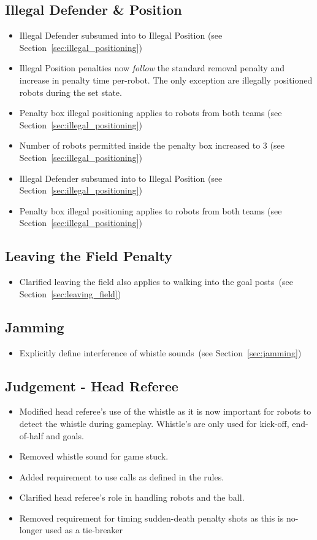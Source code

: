 \documentclass[12pt]{article}
\newcommand{\cf}{see\xspace}
\begin{document}
\subsection*{Illegal Defender \& Position}
\begin{itemize}
  \item Illegal Defender subsumed into to Illegal Position (\cf Section~\ref{sec:illegal_positioning})
  \item Illegal Position penalties now \textit{follow} the standard removal penalty and increase in penalty time per-robot. The only exception are illegally positioned robots during the set state.
  \item Penalty box illegal positioning applies to robots from both teams (\cf Section~\ref{sec:illegal_positioning})
  \item Number of robots permitted inside the penalty box increased to 3 (\cf Section~\ref{sec:illegal_positioning})
  \item Illegal Defender subsumed into to Illegal Position (\cf Section~\ref{sec:illegal_positioning})
  \item Penalty box illegal positioning applies to robots from both teams (\cf Section~\ref{sec:illegal_positioning})
\end{itemize}

\subsection*{Leaving the Field Penalty}
\begin{itemize}
  \item Clarified leaving the field also applies to walking into the goal posts~(\cf Section~\ref{sec:leaving_field})
\end{itemize}

\subsection*{Jamming}
\begin{itemize}
  \item Explicitly define interference of whistle sounds~(\cf Section~\ref{sec:jamming})
\end{itemize}

\subsection*{Judgement - Head Referee}
\begin{itemize}
  \item Modified head referee's use of the whistle as it is now important for robots to detect the whistle during gameplay. Whistle's are only used for kick-off, end-of-half and goals.
  \item Removed whistle sound for game stuck.
  \item Added requirement to use calls as defined in the rules.
  \item Clarified head referee's role in handling robots and the ball.
  \item Removed requirement for timing sudden-death penalty shots as this is no-longer used as a tie-breaker
\end{itemize}
\end{document}
